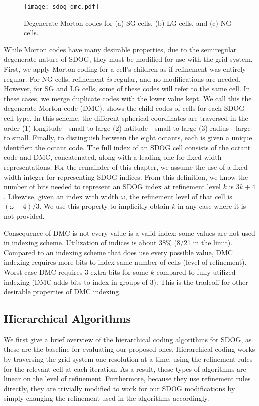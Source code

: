 \begin{figure}[ht!]
	\centering
	\texttt{[image: sdog-dmc.pdf]}
	\caption[Degenerate Morton codes for the different SDOG cell types]{
		Degenerate Morton codes for (a) SG cells, (b) LG cells, and (c) NG cells.
	}
	\label{fig:sdog-dmc}
\end{figure}


While Morton codes have many desirable properties, due to the semiregular degenerate nature of SDOG, they must be modified for use with the grid system.
First, we apply Morton coding for a cell's children as if refinement was entirely regular.
For NG cells, refinement \textit{is} regular, and no modifications are needed.
However, for SG and LG cells, some of these codes will refer to the same cell.
In these cases, we merge duplicate codes with the lower value kept.
We call this the degenerate Morton code (DMC).
 shows the child codes of cells for each SDOG cell type.
In this scheme, the different spherical coordinates are traversed in the order (1) longitude---small to large (2) latitude---small to large (3) radius---large to small.
Finally, to distinguish between the eight octants, each is given a unique identifier: the octant code.
The full index of an SDOG cell consists of the octant code and DMC, concatenated, along with a leading one for fixed-width representations.
For the remainder of this chapter, we assume the use of a fixed-width integer for representing SDOG indices.
From this definition, we know the number of bits needed to represent an SDOG index at refinement level $k$ is $3k + 4$.
Likewise, given an index with width $\omega$, the refinement level of that cell is $(\omega - 4) / 3$.
We use this property to implicitly obtain $k$ in any case where it is not provided.


Consequence of DMC is not every value is a valid index; some values are not used in indexing scheme.
Utilization of indices is about 38\% (8/21 in the limit).
Compared to an indexing scheme that does use every possible value, DMC indexing requires more bits to index same number of cells (level of refinement).
Worst case DMC requires 3 extra bits for some $k$ compared to fully utilized indexing (DMC adds bits to index in groups of 3).
This is the tradeoff for other desirable properties of DMC indexing.%


\subsection{Hierarchical Algorithms}
We first give a brief overview of the hierarchical coding algorithms for SDOG, as these are the baseline for evaluating our proposed ones.
Hierarchical coding works by traversing the grid system one resolution at a time, using the refinement rules for the relevant cell at each iteration.
As a result, these types of algorithms are linear on the level of refinement.
Furthermore, because they use refinement rules directly, they are trivially modified to work for our SDOG modifications by simply changing the refinement used in the algorithms accordingly.


